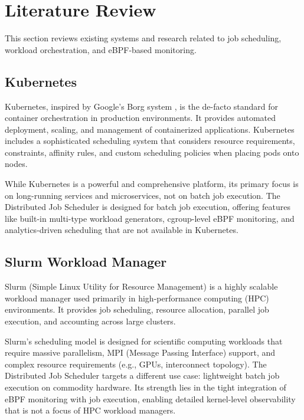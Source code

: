 \section{Literature Review}

This section reviews existing systems and research related to job scheduling, workload orchestration, and eBPF-based monitoring.

\subsection{Kubernetes}

Kubernetes, inspired by Google's Borg system \cite{burns2016borg}, is the de-facto standard for container orchestration in production environments. It provides automated deployment, scaling, and management of containerized applications. Kubernetes includes a sophisticated scheduling system that considers resource requirements, constraints, affinity rules, and custom scheduling policies when placing pods onto nodes.

While Kubernetes is a powerful and comprehensive platform, its primary focus is on long-running services and microservices, not on batch job execution. The Distributed Job Scheduler is designed for batch job execution, offering features like built-in multi-type workload generators, cgroup-level eBPF monitoring, and analytics-driven scheduling that are not available in Kubernetes.

\subsection{Slurm Workload Manager}

Slurm (Simple Linux Utility for Resource Management) \cite{jette2023slurm} is a highly scalable workload manager used primarily in high-performance computing (HPC) environments. It provides job scheduling, resource allocation, parallel job execution, and accounting across large clusters.

Slurm's scheduling model is designed for scientific computing workloads that require massive parallelism, MPI (Message Passing Interface) support, and complex resource requirements (e.g., GPUs, interconnect topology). The Distributed Job Scheduler targets a different use case: lightweight batch job execution on commodity hardware. Its strength lies in the tight integration of eBPF monitoring with job execution, enabling detailed kernel-level observability that is not a focus of HPC workload managers.

